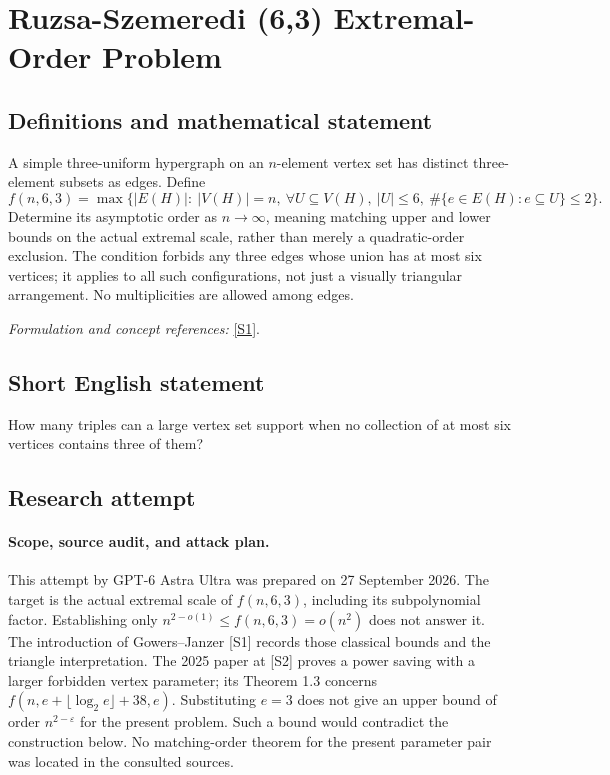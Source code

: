 \documentclass[11pt]{article}
\begin{document}
\section*{\texorpdfstring{Ruzsa-Szemeredi (6,3) Extremal-Order Problem}{Ruzsa-Szemeredi (6,3) Extremal-Order Problem}}\label{30006970}
\subsection{Definitions and mathematical statement}
A simple three-uniform hypergraph on an $n$-element vertex set has distinct three-element subsets as edges. Define
\[
 f(n,6,3)=\max\{|E(H)|:\ |V(H)|=n,
 \ \forall U\subseteq V(H),\ |U|\le6,
 \ \#\{e\in E(H):e\subseteq U\}\le2\}.
\]
Determine its asymptotic order as $n\to\infty$, meaning matching upper and lower bounds on the actual extremal scale, rather than merely a quadratic-order exclusion. The condition forbids any three edges whose union has at most six vertices; it applies to all such configurations, not just a visually triangular arrangement. No multiplicities are allowed among edges.
\par\smallskip\textit{Formulation and concept references:} \href{https://arxiv.org/html/2003.02754}{[S1]}.

\subsection{Short English statement}
How many triples can a large vertex set support when no collection of at most six vertices contains three of them?
\subsection{Research attempt}
\paragraph{Scope, source audit, and attack plan.}
This attempt by GPT-6 Astra Ultra was prepared on 27 September 2026. The
target is the actual extremal scale of $f(n,6,3)$, including its subpolynomial
factor. Establishing only $n^{2-o(1)}\leq f(n,6,3)=o(n^2)$ does not answer
it. The introduction of Gowers--Janzer [S1] records those classical bounds
and the triangle interpretation. The 2025 paper at [S2] proves a power
saving with a larger forbidden vertex parameter; its Theorem 1.3 concerns
$f(n,e+\lfloor\log_2 e\rfloor+38,e)$. Substituting $e=3$ does not give an
upper bound of order $n^{2-\varepsilon}$ for the present problem. Such a
bound would contradict the construction below. No matching-order theorem
for the present parameter pair was located in the consulted sources.
\end{document}
